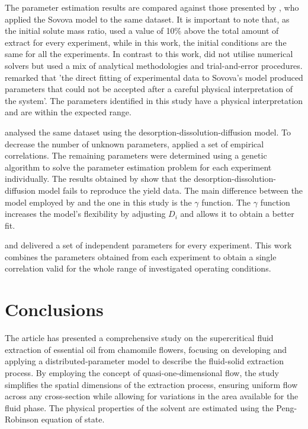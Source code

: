 \documentclass[a4paper,fleqn]{cas-dc}
\begin{document}
The parameter estimation results are compared against those presented by \citet{Povh2001}, who applied the Sovova model to the same dataset. It is important to note that, as the initial solute mass ratio, \citet{Povh2001} used  a value of 10\% above the total amount of extract for every experiment, while in this work, the initial conditions are the same for all the experiments. In contrast to this work, \citet{Povh2001} did not utilise numerical solvers but used a mix of analytical methodologies and trial-and-error procedures. \citet{Povh2001} remarked that 'the direct fitting of experimental data to Sovova's model produced parameters that could not be accepted after a careful physical interpretation of the system'. The parameters identified in this study have a physical interpretation and are within the expected range.

\citet{Rahimi2011} analysed the same dataset using the desorption-dissolution-diffusion model. To decrease the number of unknown parameters, \citet{Rahimi2011} applied a set of empirical correlations. The remaining parameters were determined using a genetic algorithm to solve the parameter estimation problem for each experiment individually. The results obtained by \citet{Rahimi2011} show that the desorption-dissolution-diffusion model fails to reproduce the yield data. The main difference between the model employed by \citet{Rahimi2011} and the one in this study is the $\gamma$ function. The $\gamma$ function increases the model's flexibility by adjusting $D_i$ and allows it to obtain a better fit.

\citet{Povh2001} and \citet{Rahimi2011} delivered a set of independent parameters for every experiment. This work combines the parameters obtained from each experiment to obtain a single correlation valid for the whole range of investigated operating conditions.

\section{Conclusions} \label{CH: Conclusion}

The article has presented a comprehensive study on the supercritical fluid extraction of essential oil from chamomile flowers, focusing on developing and applying a distributed-parameter model to describe the fluid-solid extraction process. By employing the concept of quasi-one-dimensional flow, the study simplifies the spatial dimensions of the extraction process, ensuring uniform flow across any cross-section while allowing for variations in the area available for the fluid phase. The physical properties of the solvent are estimated using the Peng-Robinson equation of state.
\end{document}
